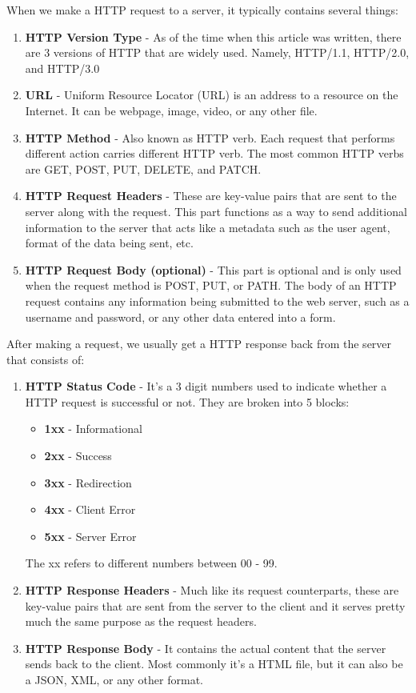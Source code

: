 \documentclass[12pt,titlepage]{article}
\begin{document}
When we make a HTTP request to a server, it typically contains several things:
\begin{enumerate}
    \item {
        \textbf{HTTP Version Type} - As of the time when this article was written, there are 3 versions of HTTP that are widely used.
        Namely, HTTP/1.1, HTTP/2.0, and HTTP/3.0
    }
    \item {
        \textbf{URL} - Uniform Resource Locator (URL) is an address to a resource on the Internet.
        It can be  webpage, image, video, or any other file.
    }
    \item {
        \textbf{HTTP Method} - Also known as HTTP verb. Each request that performs different action
        carries different HTTP verb. The most common HTTP verbs are GET, POST, PUT, DELETE, and PATCH.
    }
    \item {
        \textbf{HTTP Request Headers} - These are key-value pairs that are sent to the server along with the request.
        This part functions as a way to send additional information to the server that acts like a metadata such as the user agent,
        format of the data being sent, etc.
    }
    \item {
        \textbf{HTTP Request Body (optional)} - This part is optional and is only used when the request method is POST, PUT, or PATH.
        The body of an HTTP request contains any information being submitted to the web server, such as a username and password, or any other data entered into a form.
    }
\end{enumerate}

After making a request, we usually get a HTTP response back from the server that consists of:
\begin{enumerate}
    \item {
        \textbf{HTTP Status Code} - It's a 3 digit numbers used to indicate whether a HTTP request
        is successful or not. They are broken into 5 blocks:
        \begin{itemize}
            \item \textbf{1xx} - Informational
            \item \textbf{2xx} - Success
            \item \textbf{3xx} - Redirection
            \item \textbf{4xx} - Client Error
            \item \textbf{5xx} - Server Error
        \end{itemize}
        The xx refers to different numbers between 00 - 99.
    }
    \item {
        \textbf{HTTP Response Headers} - Much like its request counterparts, these are key-value pairs that are
        sent from the server to the client and it serves pretty much the same purpose as the request headers.
    }
    \item {
        \textbf{HTTP Response Body} - It contains the actual content that the server sends back to the client.
        Most commonly it's a HTML file, but it can also be a JSON, XML, or any other format.
    }
\end{enumerate}
\end{document}
